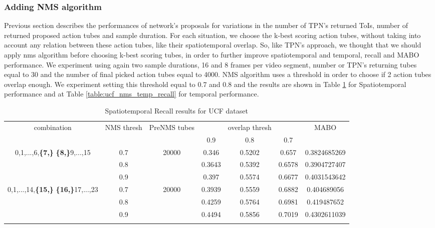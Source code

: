 \subsubsection{Adding NMS algorithm}

Previous section describes the performances of network's proposals for variations in the number of  TPN's  returned ToIs, number of returned
proposed action tubes and sample duration. For each situation, we choose the k-best scoring action tubes, without taking into account
any relation between these action tubes, like their spatiotemporal overlap. So, like TPN's approach, we thought that we should apply
nms algorithm before choosing k-best scoring tubes, in order to further improve  spatiotemporal and temporal, recall and MABO  performance.
We experiment using again two sample durations, 16 and 8 frames per video segment, number or TPN's returning tubes equal to 30 and the
number of final picked action tubes equal to 4000. NMS algorithm uses a threshold in order to choose if 2 action tubes overlap enough. We
experiment setting this threshold equal to 0.7 and 0.8 and  the results are shown in Table \ref{table:ucf_nms_recall} for Spatiotemporal
performance and at Table \ref{table:ucf_nms_temp_recall} for temporal performance.

\begin{center}
  \setlength{\tabcolsep}{2pt}
\begin{longtable}{||c | c | c | c c c| c|}

  \hline
  \multirow{2}{*}{combination} & \multirow{2}{2.5em}{NMS thresh} & \multirow{2}{3.5em}{PreNMS tubes} &  {} &overlap thresh & {} & \multirow{2}{*}{MABO} \\
  {} & {} & {} &  0.9 &  0.8 & 0.7 & {}\\         
  \hline
  \multirow{3}{7em}{0,1,...,6,\textbf{\{7,\}}
  \textbf{\{8,\}}9,...,15 }  & 0.7 &\multirow{3}{*}{20000}  & 0.346 & 0.5202 & 0.657 & 0.3824685269 \\
  \cline{2-2} \cline{4-7} 
  {} &  0.8   & {}   & 0.3643 & 0.5392 & 0.6578 & 0.3904727407 \\
  \cline{2-2} \cline{4-7} 
  {} &  0.9   & {}   & 0.397  & 0.5574 & 0.6677 & 0.4031543642 \\
  \hline                                    
  \multirow{3}{7em}{0,1,...,14,\textbf{\{15,\}}
  \textbf{\{16,\}}17,...,23 }  & 0.7 & \multirow{3}{*}{20000}   & 0.3939 & 0.5559  & 0.6882 & 0.404689056 \\
  \cline{2-2} \cline{4-7} 
                                    {} &  0.8   & {}   & 0.4259 & 0.5764 & 0.6981 & 0.419487652 \\
  \cline{2-2} \cline{4-7} 
                                    {} &  0.9   & {}   & 0.4494 & 0.5856 & 0.7019 & 0.4302611039 \\

  \hline                                    

  \caption{Spatiotemporal Recall results for UCF dataset}
  \label{table:ucf_nms_recall}
\end{longtable} 
\end{center}

